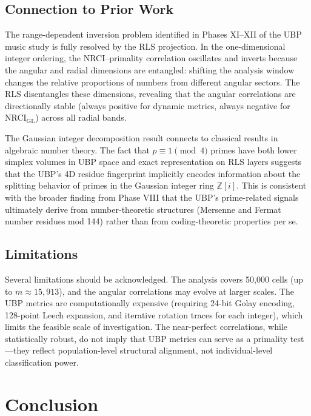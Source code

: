 \documentclass[11pt,a4paper]{article}
\theoremstyle{definition}
\newcommand{\Z}{\mathbb{Z}}
\begin{document}
\subsection{Connection to Prior Work}

The range-dependent inversion problem identified in Phases XI--XII of the UBP music study\cite{ubp_music} is fully resolved by the RLS projection. In the one-dimensional integer ordering, the NRCI--primality correlation oscillates and inverts because the angular and radial dimensions are entangled: shifting the analysis window changes the relative proportions of numbers from different angular sectors. The RLS disentangles these dimensions, revealing that the angular correlations are directionally stable (always positive for dynamic metrics, always negative for NRCI$_{\text{GL}}$) across all radial bands.

The Gaussian integer decomposition result connects to classical results in algebraic number theory. The fact that $p \equiv 1 \pmod{4}$ primes have both lower simplex volumes in UBP space and exact representation on RLS layers suggests that the UBP's 4D residue fingerprint implicitly encodes information about the splitting behavior of primes in the Gaussian integer ring $\Z[i]$. This is consistent with the broader finding from Phase VIII that the UBP's prime-related signals ultimately derive from number-theoretic structures (Mersenne and Fermat number residues mod 144) rather than from coding-theoretic properties per se\cite{ubp_music}.

\subsection{Limitations}

Several limitations should be acknowledged. The analysis covers 50,000 cells (up to $m \approx 15{,}913$), and the angular correlations may evolve at larger scales. The UBP metrics are computationally expensive (requiring 24-bit Golay encoding, 128-point Leech expansion, and iterative rotation traces for each integer), which limits the feasible scale of investigation. The near-perfect correlations, while statistically robust, do not imply that UBP metrics can serve as a primality test---they reflect population-level structural alignment, not individual-level classification power.

\section{Conclusion}\label{sec:conclusion}
\end{document}
